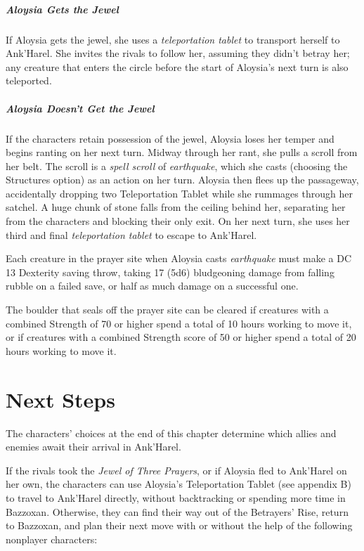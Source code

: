 \documentclass[10pt,a4paper,twoside,bg=print,twocolumn,openany,nodeprecatedcode]{dndbook}
\begin{document}
\subparagraph{Aloysia Gets the Jewel}
If Aloysia gets the jewel, she uses a \textit{teleportation tablet} to transport herself to Ank'Harel. She invites the rivals to follow her, assuming they didn't betray her; any creature that enters the circle before the start of Aloysia's next turn is also teleported.

\subparagraph{Aloysia Doesn't Get the Jewel}
If the characters retain possession of the jewel, Aloysia loses her temper and begins ranting on her next turn. Midway through her rant, she pulls a scroll from her belt. The scroll is a \textit{spell scroll} of \textit{earthquake}, which she casts (choosing the Structures option) as an action on her turn. Aloysia then flees up the passageway, accidentally dropping two Teleportation Tablet while she rummages through her satchel. A huge chunk of stone falls from the ceiling behind her, separating her from the characters and blocking their only exit. On her next turn, she uses her third and final \textit{teleportation tablet} to escape to Ank'Harel.

Each creature in the prayer site when Aloysia casts \textit{earthquake} must make a DC 13 Dexterity saving throw, taking 17 (5d6) bludgeoning damage from falling rubble on a failed save, or half as much damage on a successful one.

The boulder that seals off the prayer site can be cleared if creatures with a combined Strength of 70 or higher spend a total of 10 hours working to move it, or if creatures with a combined Strength score of 50 or higher spend a total of 20 hours working to move it.

\section{Next Steps}
The characters' choices at the end of this chapter determine which allies and enemies await their arrival in Ank'Harel.

If the rivals took the \textit{Jewel of Three Prayers}, or if Aloysia fled to Ank'Harel on her own, the characters can use Aloysia's Teleportation Tablet (see appendix B) to travel to Ank'Harel directly, without backtracking or spending more time in Bazzoxan. Otherwise, they can find their way out of the Betrayers' Rise, return to Bazzoxan, and plan their next move with or without the help of the following nonplayer characters:
\end{document}
